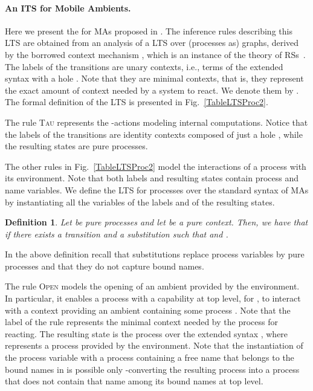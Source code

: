 \documentclass[copyright,creativecommons]{eptcs}
\newcommand{\<}{\langle}
\renewcommand{\>}{\rangle}
\newtheorem{definition}{Definition}{}
\begin{document}
\paragraph{An ITS for Mobile Ambients.}
Here we present the   for MAs proposed in
\cite{BoGaMo}. The inference rules describing this LTS
are obtained
from an analysis of a LTS over (processes as) graphs, derived by the
borrowed context mechanism \cite{EK:06}, which is an instance of the
theory of RSs~\cite{graphslics}.  The labels of the
transitions are unary contexts, i.e., terms of the extended syntax
with a hole . Note that they are minimal contexts, that is, they
represent the exact amount of context needed by a system to react.  We
denote them by .  The formal definition of the LTS is
presented in Fig.~\ref{TableLTSProc2}.

The rule \textsc{Tau} represents the -actions
modeling internal computations.  Notice that the labels of the
transitions are identity contexts composed of just a hole , while the
resulting states are pure processes.


The other rules in Fig.~\ref{TableLTSProc2} model the interactions of
a process with its environment. Note that both labels and resulting
states contain process and name variables.  We define the LTS
 for processes over the standard syntax of MAs by
instantiating all the variables of the labels and of the resulting
states.

\begin{definition}
\label{instance}
Let  be pure processes and let  be a pure context.  Then,
we have that  if there exists a
transition  and a
substitution  such that  and
.
\end{definition}

In the above definition recall that substitutions replace process
variables by pure processes and that they do not capture bound names.

The rule \textsc{Open} models the opening of an ambient provided by
the environment. In particular, it enables a process  with a
capability  at top level, for , to
interact with a context providing an ambient  containing some
process . Note that the label  of the rule represents
the minimal context needed by the process 
for reacting.  The resulting state is the process over the extended
syntax , where  represents a process
provided by the environment.  Note that the instantiation of the
process variable  with a process containing a free name that
belongs to the bound names in  is possible only -converting
the resulting process  into a process that does
not contain that name among its bound names at top level.
\end{document}
